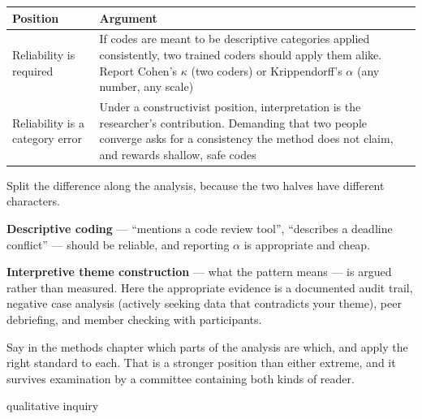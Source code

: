 \begin{center}
\small
\begin{tabular}{@{}L{4.0cm}L{10.3cm}@{}}
\toprule
\textbf{Position} & \textbf{Argument} \\
\midrule
Reliability is required
  & If codes are meant to be descriptive categories applied consistently, two
    trained coders should apply them alike. Report Cohen's $\kappa$ (two
    coders) or Krippendorff's $\alpha$ (any number, any
    scale)~\cite{krippendorff2018content} \\
Reliability is a category error
  & Under a constructivist position, interpretation is the researcher's
    contribution. Demanding that two people converge asks for a consistency the
    method does not claim, and rewards shallow, safe codes \\
\bottomrule
\end{tabular}
\end{center}

\begin{conceptbox}
Split the difference along the analysis, because the two halves have different
characters.

\medskip
\textbf{Descriptive coding} --- ``mentions a code review tool'', ``describes a
deadline conflict'' --- should be reliable, and reporting $\alpha$ is
appropriate and cheap.

\medskip
\textbf{Interpretive theme construction} --- what the pattern means --- is
argued rather than measured. Here the appropriate evidence is a documented
audit trail, negative case analysis (actively seeking data that contradicts
your theme), peer debriefing, and member checking with participants.

\medskip
Say in the methods chapter which parts of the analysis are which, and apply the
right standard to each. That is a stronger position than either extreme, and it
survives examination by a committee containing both kinds of reader.
\end{conceptbox}

\begin{traditions}{qualitative inquiry}
\end{traditions}


